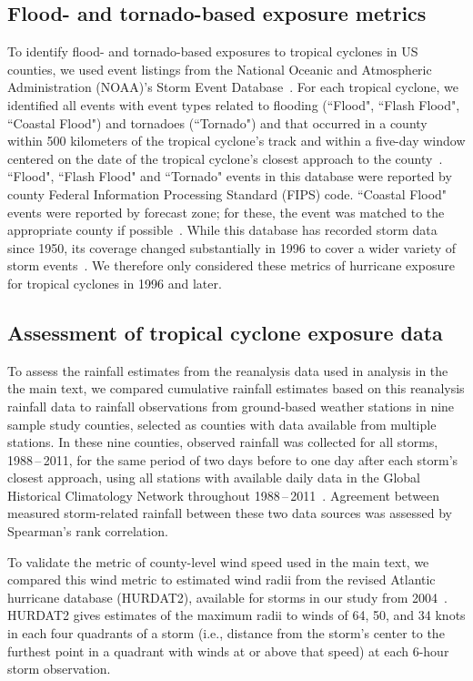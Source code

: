 \subsection*{Flood- and tornado-based exposure metrics}

To identify flood- and tornado-based exposures to tropical cyclones in \ac{US}
counties, we used event listings from the National Oceanic and Atmospheric
Administration (NOAA)'s Storm Event Database~\citep{stormevents}. For each
tropical cyclone, we identified all events with event types related to flooding
(``Flood", ``Flash Flood", ``Coastal Flood") and tornadoes (``Tornado") and
that occurred in a county within 500 kilometers of the tropical cyclone's track
and within a five-day window centered on the date of the tropical cyclone's
closest approach to the county~\citep{hurricaneexposuredata}. ``Flood", ``Flash
Flood" and ``Tornado" events in this database were reported by county Federal
Information Processing Standard (FIPS) code. ``Coastal Flood" events were
reported by forecast zone; for these, the event was matched to the appropriate
county if possible~\citep{noaastormevents}. While this database has recorded
storm data since 1950, its coverage changed substantially in 1996 to cover a
wider variety of storm events~\citep{stormevents}. We therefore only considered
these metrics of hurricane exposure for tropical cyclones in 1996 and later.

\subsection*{Assessment of tropical cyclone exposure data}

To assess the rainfall estimates from the reanalysis data used in analysis in the the 
main text, we compared cumulative rainfall estimates based on this reanalysis rainfall 
data to rainfall observations from ground-based weather stations in nine sample study 
counties, selected as counties with data available from multiple stations. In these nine
counties, observed rainfall was collected for all storms, 1988\,--\,2011, for the same period 
of two days before to one day after each storm's closest approach, using all stations with
available daily data in the Global Historical Climatology Network throughout 
1988\,--\,2011~\citep{menne2012overview, rnoaa, countyweather}. Agreement between 
measured storm-related rainfall between these two data sources was assessed by 
Spearman's rank correlation. 

To validate the metric of county-level wind speed used in the main text, we compared this 
wind metric to estimated wind radii from the revised Atlantic hurricane database (HURDAT2),
available for storms in our study from 2004~\citep{landsea2013}. HURDAT2 gives estimates of
the maximum radii to winds of 64, 50, and 34 knots in each four quadrants of a storm (i.e.,
distance from the storm's center to the furthest point in a quadrant with winds at or above
that speed) at each 6-hour storm observation. 

